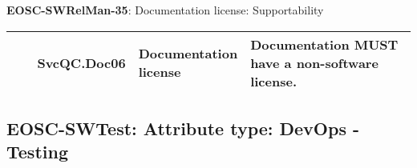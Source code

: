 \textbf{EOSC-SWRelMan-35}: Documentation license: Supportability
\nopagebreak[4]
\begin{center}
    \tabletail{\hline}
    \tiny
    \begin{supertabular}{|p{0.10\linewidth}|p{0.10\linewidth}|p{0.20\linewidth}|p{0.60\linewidth}|} \hline
        \cite{orviz_fernandez_eosc-synergy_2020} & SvcQC.Doc06 & Documentation license & Documentation MUST have a non-software license.\\ \hline
    \end{supertabular}
\end{center}

\subsection{EOSC-SWTest: Attribute type: DevOps - Testing}

